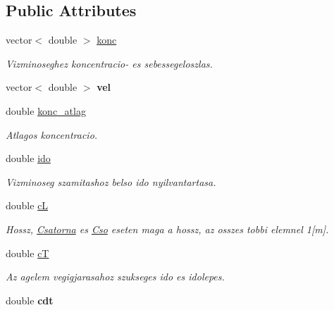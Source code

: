 \subsection*{Public Attributes}
\begin{DoxyCompactItemize}
\item 
vector$<$ double $>$ \hyperlink{class_agelem_ae31b4979900d8e4c254c4405b04df2a0}{konc}\hypertarget{class_agelem_ae31b4979900d8e4c254c4405b04df2a0}{}\label{class_agelem_ae31b4979900d8e4c254c4405b04df2a0}

\begin{DoxyCompactList}\small\item\em Vizminoseghez koncentracio-\/ es sebessegeloszlas. \end{DoxyCompactList}\item 
vector$<$ double $>$ {\bfseries vel}\hypertarget{class_agelem_ae067f6cce2ca3f7d8c03c363d1ac6879}{}\label{class_agelem_ae067f6cce2ca3f7d8c03c363d1ac6879}

\item 
double \hyperlink{class_agelem_a23aaf89345c6b3c6ad6d90fc26b01b54}{konc\+\_\+atlag}\hypertarget{class_agelem_a23aaf89345c6b3c6ad6d90fc26b01b54}{}\label{class_agelem_a23aaf89345c6b3c6ad6d90fc26b01b54}

\begin{DoxyCompactList}\small\item\em Atlagos koncentracio. \end{DoxyCompactList}\item 
double \hyperlink{class_agelem_a0cdf382c62ac004b8a120319be0cea84}{ido}\hypertarget{class_agelem_a0cdf382c62ac004b8a120319be0cea84}{}\label{class_agelem_a0cdf382c62ac004b8a120319be0cea84}

\begin{DoxyCompactList}\small\item\em Vizminoseg szamitashoz belso ido nyilvantartasa. \end{DoxyCompactList}\item 
double \hyperlink{class_agelem_ab72f11ac2c7182de3a5c21943e9350a0}{cL}\hypertarget{class_agelem_ab72f11ac2c7182de3a5c21943e9350a0}{}\label{class_agelem_ab72f11ac2c7182de3a5c21943e9350a0}

\begin{DoxyCompactList}\small\item\em Hossz, \hyperlink{class_csatorna}{Csatorna} es \hyperlink{class_cso}{Cso} eseten maga a hossz, az osszes tobbi elemnel 1\mbox{[}m\mbox{]}. \end{DoxyCompactList}\item 
double \hyperlink{class_agelem_a164f2afad3ab19d298c73a865e82aa0b}{cT}\hypertarget{class_agelem_a164f2afad3ab19d298c73a865e82aa0b}{}\label{class_agelem_a164f2afad3ab19d298c73a865e82aa0b}

\begin{DoxyCompactList}\small\item\em Az agelem vegigjarasahoz szukseges ido es idolepes. \end{DoxyCompactList}\item 
double {\bfseries cdt}\hypertarget{class_agelem_ab2e1162f1ae624444515fb09bcfa5e8e}{}\label{class_agelem_ab2e1162f1ae624444515fb09bcfa5e8e}

\end{DoxyCompactItemize}
